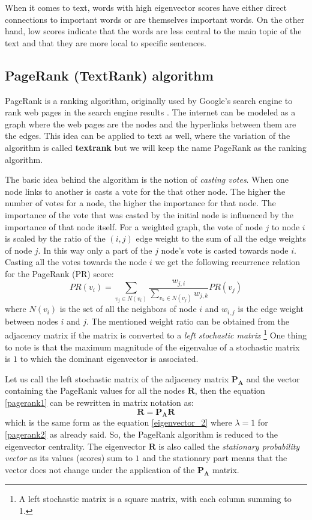 \documentclass[12pt]{article}
\numberwithin{equation}{section}
\begin{document}
\begin{spacing}{1.5}
	When it comes to text, words with high eigenvector scores have either direct connections to important words or are themselves important words. On the other hand, low scores indicate that the words are less central to the main topic of the text and that they are more local to specific sentences.
	
	\subsection{PageRank (TextRank) algorithm}
	PageRank is a ranking algorithm, originally used by Google's search engine to rank web pages in the search engine results \cite{pagerank}. The internet can be modeled as a graph where the web pages are the nodes and the hyperlinks between them are the edges. This idea can be applied to text as well, where the variation of the algorithm is called \textbf{textrank} \cite{textrank} but we will keep the name PageRank as the ranking algorithm.
	
	The basic idea behind the algorithm is the notion of \textit{casting votes}. When one node links to another is casts a vote for the that other node. The higher the number of votes for a node, the higher the importance for that node. The importance of the vote that was casted by the initial node is influenced by the importance of that node itself. For a weighted graph, the vote of node $j$ to node $i$ is scaled by the ratio of the $(i,j)$ edge weight to the sum of all the edge weights of node $j$. In this way only a part of the $j$ node's vote is casted towards node $i$. Casting all the votes towards the node $i$ we get the following recurrence relation for the PageRank (PR) score: 
	\begin{equation}\label{pagerank1}
		PR(v_i) = \sum_{v_j \in N(v_i)} \frac{w_{j,i}}{\sum_{v_k \in N(v_j)} w_{j,k}} PR(v_j) 
	\end{equation}
	where $N(v_i)$ is the set of all the neighbors of node $i$ and $w_{i,j}$ is the edge weight between nodes $i$ and $j$. The mentioned weight ratio can be obtained from the adjacency matrix if the matrix is converted to a \textit{left stochastic matrix} \footnote{A left stochastic matrix is a square matrix, with each column summing to 1.} One thing to note is that the maximum magnitude of the eigenvalue of a stochastic matrix is $1$ to which the dominant eigenvector is associated.
	
	Let us call the left stochastic matrix of the adjacency matrix $\mathbf{P}_\mathbf{A}$ and the vector containing the PageRank values for all the nodes $\mathbf{R}$, then the equation \ref{pagerank1} can be rewritten in matrix notation as:
	\begin{equation}\label{pagerank2}
		\mathbf{R} = \mathbf{P}_\mathbf{A} \mathbf{R}
	\end{equation}
	which is the same form as the equation \ref{eigenvector_2} where $\lambda = 1$ for \ref{pagerank2} as already said. So, the PageRank algorithm is reduced to the eigenvector centrality. The eigenvector $\mathbf{R}$ is also called the \textit{stationary probability vector} as its values (scores) sum to $1$ and the stationary part means that the vector does not change under the application of the $\mathbf{P}_\mathbf{A}$ matrix. 
	

\end{spacing}
\end{document}
